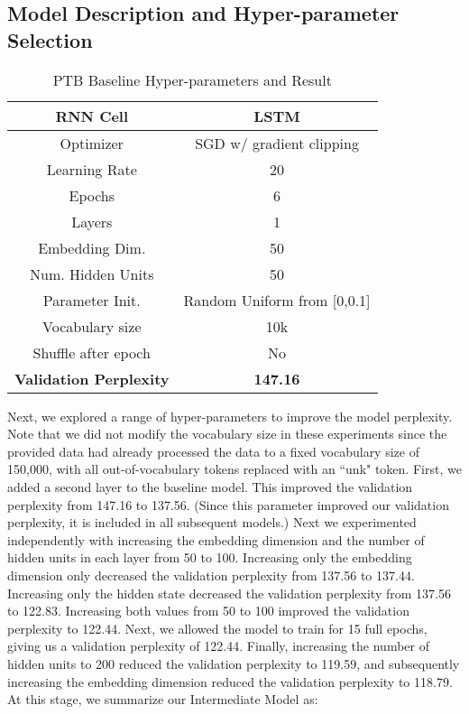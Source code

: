 \documentclass[a4paper]{article}
\begin{document}
\subsection*{Model Description and Hyper-parameter Selection}

\begin{table}[h]
\centering
\begin{tabular}{|c | c|} 
 \hline
RNN Cell & LSTM\\ \hline
Optimizer & SGD w/ gradient clipping \\ \hline
Learning Rate & 20 \\ \hline
Epochs & 6\\ \hline
Layers & 1\\ \hline
Embedding Dim. & 50\\ \hline
Num. Hidden Units & 50\\ \hline
Parameter Init. & Random Uniform from [0,0.1]\\ \hline
Vocabulary size & 10k\\ \hline
Shuffle after epoch & No \\ \hline
\textbf{Validation Perplexity} &\textbf{147.16} \\ \hline
\end{tabular}
\caption{PTB Baseline Hyper-parameters and Result}
\label{table:1}
\end{table}

Next, we explored a range of hyper-parameters to improve the model perplexity. Note that we did not modify the vocabulary size in these experiments since the provided data had already processed the data to a fixed vocabulary size of 150,000, with all out-of-vocabulary tokens replaced with an ``unk" token. 
\newline
\newline
First, we added a second layer to the baseline model. This improved the validation perplexity from 147.16 to 137.56. (Since this parameter improved our validation perplexity, it is included in all subsequent models.) Next we experimented independently with increasing the embedding dimension and the number of hidden units in each layer from 50 to 100. Increasing only the embedding dimension only decreased the validation perplexity from 137.56 to 137.44. Increasing only the hidden state decreased the validation perplexity from 137.56 to 122.83. Increasing both values from 50 to 100 improved the validation perplexity to 122.44. Next, we allowed the model to train for 15 full epochs, giving us a validation perplexity of 122.44. Finally, increasing the number of hidden units to 200 reduced the validation perplexity to 119.59, and subsequently increasing the embedding dimension reduced the validation perplexity to 118.79.
\newline
\newline
At this stage, we summarize our Intermediate Model as:
\end{document}
